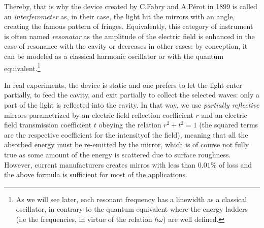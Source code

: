 \documentclass[12pt]{report}
\begin{document}
Thereby, that is why the device created by C.Fabry and A.Pérot in 1899 is called an \textit{interferometer} as, in their case, the light hit the mirrors with an angle, creating the famous pattern of fringes. Equivalently, this category of instrument is often named \textit{resonator} as the amplitude of the electric field is enhanced in the case of resonance with the cavity or decreases in other cases: by conception, it can be modeled as a classical harmonic oscillator or with the quantum equivalent.\footnote{As we will see later, each resonant frequency has a linewidth as a classical oscillator, in contrary to the quantum equivalent where the energy ladders (i.e the frequencies, in virtue of the relation $ \hbar \omega$) are well defined.}

In real experiments, the device is static and one prefers to let the light enter partially, to feed the cavity, and exit partially to collect the selected waves: only a part of the light is reflected into the cavity. In that way, we use \textit{partially reflective} mirrors parametrized by an electric field reflection coefficient $r$ and an electric field transmission coefficient $t$ obeying the relation $r^2 + t^2 = 1$ (the squared terms are the respective coefficient for the intensityof the field), meaning that all the absorbed energy must be re-emitted by the mirror, which is of course not fully true as some amount of the energy is scattered due to surface roughness. However, current manufacturers creates mirros with less than $0.01\%$ of loss and the above formula is sufficient for most of the applications.
\end{document}
